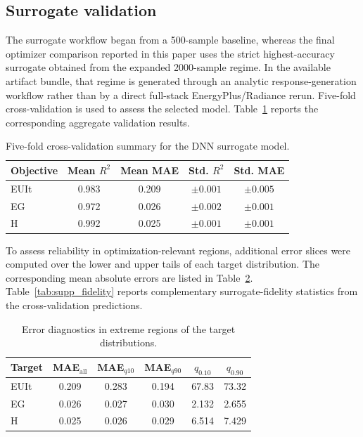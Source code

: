 \subsection{Surrogate validation}

The surrogate workflow began from a 500-sample baseline, whereas the final optimizer comparison reported in this paper uses the strict highest-accuracy surrogate obtained from the expanded 2000-sample regime. In the available artifact bundle, that regime is generated through an analytic response-generation workflow rather than by a direct full-stack EnergyPlus/Radiance rerun. Five-fold cross-validation is used to assess the selected model. Table~\ref{tab:supp_cv} reports the corresponding aggregate validation results.

\begin{table}[H]
\centering
\caption{Five-fold cross-validation summary for the DNN surrogate model.}
\label{tab:supp_cv}
\begin{threeparttable}
\begin{tabular*}{\linewidth}{@{\extracolsep{\fill}}lcccc@{}}
\toprule
Objective & Mean $R^2$ & Mean MAE & Std. $R^2$ & Std. MAE \\
\midrule
EUIt & 0.983 & 0.209 & $\pm 0.001$ & $\pm 0.005$ \\
EG   & 0.972 & 0.026 & $\pm 0.002$ & $\pm 0.001$ \\
H    & 0.992 & 0.025 & $\pm 0.001$ & $\pm 0.001$ \\
\bottomrule
\end{tabular*}
\end{threeparttable}
\end{table}

To assess reliability in optimization-relevant regions, additional error slices were computed over the lower and upper tails of each target distribution. The corresponding mean absolute errors are listed in Table~\ref{tab:supp_extreme}. Table~\ref{tab:supp_fidelity} reports complementary surrogate-fidelity statistics from the cross-validation predictions.

\begin{table}[H]
\centering
\caption{Error diagnostics in extreme regions of the target distributions.}
\label{tab:supp_extreme}
\begin{threeparttable}
\begin{tabular*}{\linewidth}{@{\extracolsep{\fill}}lccccc@{}}
\toprule
Target & MAE$_\mathrm{all}$ & MAE$_{q10}$ & MAE$_{q90}$ & $q_{0.10}$ & $q_{0.90}$ \\
\midrule
EUIt & 0.209 & 0.283 & 0.194 & 67.83 & 73.32 \\
EG   & 0.026 & 0.027 & 0.030 & 2.132 & 2.655 \\
H    & 0.025 & 0.026 & 0.029 & 6.514 & 7.429 \\
\bottomrule
\end{tabular*}
\end{threeparttable}
\end{table}

